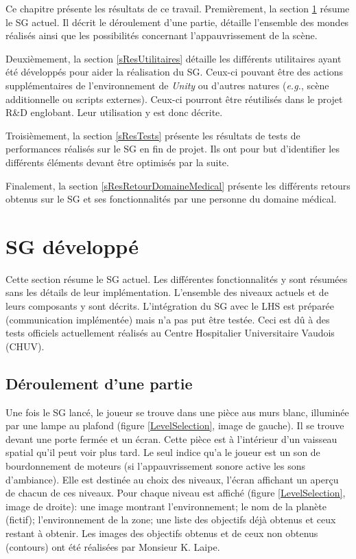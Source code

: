 Ce chapitre présente les résultats de ce travail. Premièrement, la section \ref{sResActualSG} résume le SG actuel. Il décrit le déroulement d'une partie, détaille l'ensemble des mondes réalisés ainsi que les possibilités concernant l'appauvrissement de la scène.

Deuxièmement, la section \ref{sResUtilitaires} détaille les différents utilitaires ayant été développés pour aider la réalisation du SG. Ceux-ci pouvant être des actions supplémentaires de l'environnement de \textit{Unity} ou d'autres natures (\textit{e.g.}, scène additionnelle ou scripts externes). Ceux-ci pourront être réutilisés dans le projet R\&D englobant. Leur utilisation y est donc décrite.

Troisièmement, la section \ref{sResTests} présente les résultats de tests de performances réalisés sur le SG en fin de projet. Ils ont pour but d'identifier les différents éléments devant être optimisés par la suite.

Finalement, la section \ref{sResRetourDomaineMedical} présente les différents retours obtenus sur le SG et ses fonctionnalités par une personne du domaine médical.


\section{SG développé}
	\label{sResActualSG}
	Cette section résume le SG actuel. Les différentes fonctionnalités y sont résumées sans les détails de leur implémentation. L'ensemble des niveaux actuels et de leurs composants y sont décrits. L'intégration du SG avec le LHS est préparée (communication implémentée) mais n'a pas put être testée. Ceci est dû à des tests officiels actuellement réalisés au Centre Hospitalier Universitaire Vaudois (CHUV).
	\\
	
	\subsection*{Déroulement d'une partie}
		Une fois le SG lancé, le joueur se trouve dans une pièce aus murs blanc, illuminée par une lampe au plafond (figure \ref{LevelSelection}, image de gauche). Il se trouve devant une porte fermée et un écran. Cette pièce est à l'intérieur d'un vaisseau spatial qu'il peut voir plus tard. Le seul indice qu'a le joueur est un son de bourdonnement de moteurs (si l'appauvrissement sonore active les sons d'ambiance). Elle est destinée au choix des niveaux, l'écran affichant un aperçu de chacun de ces niveaux. Pour chaque niveau est affiché (figure \ref{LevelSelection}, image de droite): une image montrant l'environnement; le nom de la planète (fictif); l'environnement de la zone; une liste des objectifs déjà obtenus et ceux restant à obtenir. Les images des objectifs obtenus et de ceux non obtenus (contours) ont été réalisées par Monsieur K. Laipe.\medskip		
		
